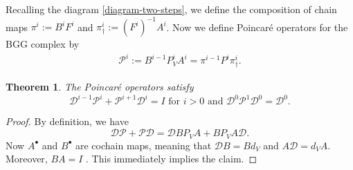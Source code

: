 \documentclass[11pt]{amsart}
\newtheorem{theorem}{Theorem}
\newcommand{\0}{\mathaccent23}
\newcommand{\bs}{{\scriptscriptstyle \bullet}}
\begin{document}
Recalling the diagram \eqref{diagram-two-steps}, we define the composition of chain maps $\pi^{i}:=B^{i} F^{i}$ and $\pi_{\dagger}^{i}:=(F^{i})^{-1} A^{i}$. Now we define Poincar\'e operators for the BGG complex by 
\begin{align}\label{def:P}
\mathscr{P}^{i}:= B^{i-1}P^{i}_{V} A^{i}= \pi^{i-1} P^{i} \pi_{\dagger}^{i}.
\end{align}
\begin{theorem}
The Poincar\'e operators satisfy 
$$
\mathscr{D}^{i-1}\mathscr{P}^{i}+\mathscr{P}^{i+1}\mathscr{D}^{i}=I { \text{\ for\ }i>0\text{\ and\ }\mathscr{D}^0\mathscr{P}^1\mathscr{D}^0=\mathscr{D}^0.}
$$
\end{theorem}
\begin{proof}
By definition, we have
$$
\mathscr{D}\mathscr{P}+\mathscr{P}\mathscr{D}=\mathscr{D}BP_{V}A+BP_{V}A\mathscr{D}.
$$
Now $A^{\bs}$ and $B^{\bs}$ are cochain maps, meaning that $\mathscr{D}B=Bd_{V}$ and $A\mathscr{D}=d_{V}A$. Moreover, $BA=I$ \cite[p.9]{vcap2022bgg}.  This immediately implies the claim.
\end{proof}
\end{document}
